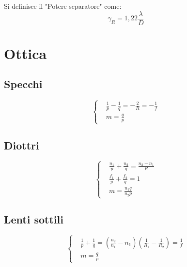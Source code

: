 \documentclass{article}
\begin{document}
Si definisce il "Potere separatore" come:
\begin{equation}
    \gamma_R=1,22\frac{\lambda}{D}
\end{equation}


\section{Ottica}
\subsection{Specchi}
\begin{equation}
\left\{
\begin{aligned}
      & \frac{1}{p}-\frac{1}{q}=-\frac{2}{R}=-\frac{1}{f} \\
      & m=\frac{q}{p}
\end{aligned}
\right.
\end{equation}

\subsection{Diottri}
\begin{equation}
\left\{
\begin{aligned}
      & \frac{n_1}{p}+\frac{n_2}{q}=\frac{n_2-n_1}{R} \\
      & \frac{f_1}{p}+\frac{f_2}{q}=1\\
      & m=\frac{n_1q}{n_2p}
\end{aligned}
\right.
\end{equation}

\subsection{Lenti sottili}
\begin{equation}
\left\{
\begin{aligned}
      & \frac{1}{p}+\frac{1}{q}= (\frac{n_2}{n_1}-n_1)(\frac{1}{R_1}-\frac{1}{R_2})=\frac{1}{f} \\
      & m=\frac{q}{p}
\end{aligned}
\right.
\end{equation}
\end{document}
